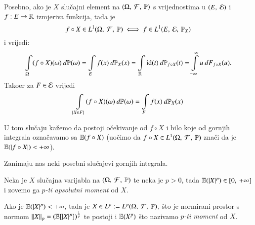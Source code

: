 Posebno, ako je $X$ slu\v cajni element na $(\Omega, \: \mathcal{F}, \: \mathbb{P})$ s vrijednostima u $({E}, \: {\mathcal{E}})$ i $f:E \to \mathbb{R}$ izmjeriva funkcija, tada je
\begin{equation*}
    f \circ X \in L^1 (\Omega, \: \mathcal{F}, \: \mathbb{P}) \iff f \in L^1 (E, \: \mathcal{E}, \: \mathbb{P}_X)
\end{equation*}
i vrijedi:
\begin{equation*}
    \int\limits_{\Omega} (f \circ X) (\omega) \: d \mathbb{P} (\omega)
    = \int\limits_E f(x) \: d \mathbb{P}_X (x)
    = \int\limits_{\mathbb{R}} \mathrm{id} (t) \: d \mathbb{P}_{f \circ X} (t)
    = \int\limits_{-\infty}^{\infty} u \: d F_{f \circ X} (u).
\end{equation*}
Tako\dj er za $F \in \mathcal{E}$ vrijedi
\begin{equation*}
    \int\limits_{\{ X \in F\}} (f \circ X) (\omega) \: d \mathbb{P} (\omega) = \int\limits_F f (x) \: d \mathbb{P}_X (x)
\end{equation*}

\begin{figure}[H]
    \centering
\end{figure}
U tom slu\v caju ka\v zemo da postoji o\v cekivanje od $f \circ X$ i bilo koje od gornjih integrala ozna\v cavamo sa $\mathbb{E}({f \circ X})$
(uo\v cimo da $f \circ X \in L^1 (\Omega, \: \mathcal{F}, \: \mathbb{P})$ zna\v ci da je $\mathbb{E}({|f \circ X|}) < +\infty$).

Zanimaju nas neki posebni slu\v cajevi gornjih integrala.

\begin{defn}    \label{defn:5.11-4}
    Neka je $X$ slu\v cajna varijabla  na $(\Omega, \: \mathcal{F}, \: \mathbb{P})$ te neka je $p > 0$, tada $\mathbb{E}({|X|^p}) \in [{0}, \:{+\infty}]$ i zovemo ga \emph{$p$-ti apsolutni moment} od $X$.
    
    Ako je $\mathbb{E}({|X|^p}) < +\infty$, tada je $X \in L^p := L^p (\Omega, \: \mathcal{F}, \: \mathbb{P})$, \v sto je normirani prostor s normom $\left\lVert {X} \right\rVert_p = (\mathbb{E} [|X|^p])^{\frac{1}{p}}$ te postoji i $\mathbb{E}({X^p})$ \v sto nazivamo \emph{$p$-ti moment} od $X$.
\end{defn}

